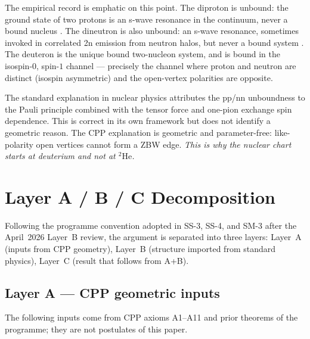 \documentclass[11pt,letterpaper]{article}
\begin{document}
The empirical record is emphatic on this point. The diproton is unbound: the ground state of two protons is an s-wave resonance in the continuum, never a bound nucleus \citep{pdg2024}. The dineutron is also unbound: an s-wave resonance, sometimes invoked in correlated 2n emission from neutron halos, but never a bound system \citep{pdg2024}. The deuteron is the unique bound two-nucleon system, and is bound in the isospin-$0$, spin-$1$ channel --- precisely the channel where proton and neutron are distinct (isospin asymmetric) and the open-vertex polarities are opposite.

The standard explanation in nuclear physics attributes the pp/nn unboundness to the Pauli principle combined with the tensor force and one-pion exchange spin dependence. This is correct in its own framework but does not identify a geometric reason. The CPP explanation is geometric and parameter-free: like-polarity open vertices cannot form a ZBW edge. \emph{This is why the nuclear chart starts at deuterium and not at ${}^{2}\mathrm{He}$.}

\section{Layer A / B / C Decomposition}
\label{sec:layers}

Following the programme convention adopted in SS-3, SS-4, and SM-3 after the April~2026 Layer~B review, the argument is separated into three layers: Layer~A (inputs from CPP geometry), Layer~B (structure imported from standard physics), Layer~C (result that follows from A+B).

\subsection{Layer A --- CPP geometric inputs}
\label{sec:layerA}

The following inputs come from CPP axioms A1--A11 and prior theorems of the programme; they are not postulates of this paper.
\end{document}
